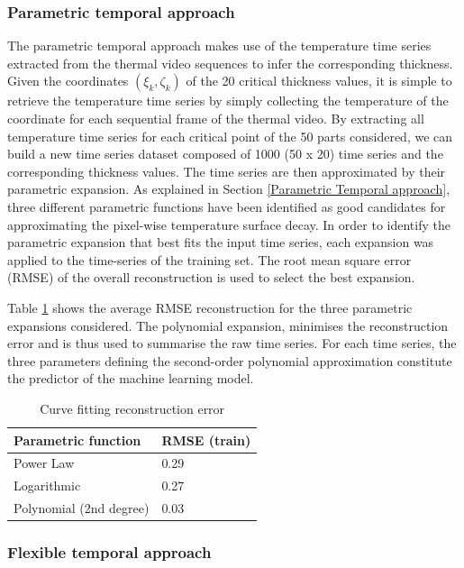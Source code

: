 \subsubsection{Parametric temporal approach}
The parametric temporal approach makes use of the temperature time series extracted from the thermal video sequences to infer the corresponding thickness. Given the coordinates $(\xi_{k}, \zeta_{k})$ of the 20 critical thickness values, it is simple to retrieve the temperature time series by simply collecting the temperature of the coordinate for each sequential frame of the thermal video. By extracting all temperature time series for each critical point of the 50 parts considered, we can build a new time series dataset composed of 1000 (50 x 20) time series and the corresponding thickness values. The time series are then approximated by their parametric expansion. As explained in Section \ref{Parametric Temporal approach}, three different parametric functions have been identified as good candidates for approximating the pixel-wise temperature surface decay. In order to identify the parametric expansion that best fits the input time series, each expansion was applied to the time-series of the training set. The root mean square error (RMSE) of the overall reconstruction is used to select the best expansion. 

Table \ref{tab:curve_fitting_error} shows the average RMSE reconstruction for the three parametric expansions considered. The polynomial expansion, minimises the reconstruction error and is thus used to summarise the raw time series.  
For each time series, the three parameters defining the second-order polynomial approximation constitute the predictor of the machine learning model.

\begin{table}
\centering
\caption{Curve fitting reconstruction error}
\begin{tabular}{ll}
\toprule
\textbf{Parametric function}    & \textbf{RMSE (train)}\\ 
\midrule

Power Law              & 0.29         \\ 
Logarithmic            & 0.27         \\ 
Polynomial (2nd degree) & 0.03         \\ 
\bottomrule
\end{tabular}
\label{tab:curve_fitting_error}
\end{table}


\subsubsection{Flexible temporal approach}

